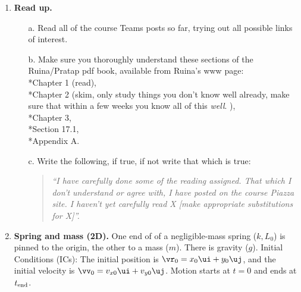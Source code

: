 \documentclass[11pt]{article}
\begin{document}
\begin{enumerate}
\[
\va\times\vb =   (a_2b_3-a_3b_2)\uei +  (a_3b_1-a_1b_3)\ueii  + (a_1b_2-a_2b_1)\ueiii.
\]

Note that, this distributive law implies that, for given $va$, $\va\times$ is a linear operator. That
is $va\times\vv$ is a linear function fo $\vv$.  Later in the course we will use this to replace the cross product with a tensor product. 

\textbf{Hint:} You can read about this in, say, the Ruina/Pratap book (box 1.7). 







\item{\bf Read up.}  

\begin{itemize}
\item[a.] Read all of the course Teams posts so far, trying out all possible links of interest.
\item[b.] Make sure you thoroughly understand these sections of the Ruina/Pratap pdf book, available from Ruina's www page:  \\
*Chapter 1 (read), \\
*Chapter 2 (skim, only study things you don't know well already, make sure that within a few weeks you know all of this \textit{well}. ), \\
*Chapter 3, \\
*Section 17.1, \\
*Appendix A.

\item[c.] Write the following, if true, if not write that which is true: 

\begin{quotation}\noindent \it ``I have carefully done some of the reading assigned.  That which I don't understand or agree with, I have posted on the course Piazza site.  I haven't yet carefully read  X  {\rm [make appropriate substitutions for X]}''.
\end{quotation}

\end{itemize}



\item\textbf{Spring and mass (2D).} One end of of a negligible-mass spring ($k, L_0$) is pinned to the origin, the other to a mass ($m$). There is gravity ($g$).  Initial Conditions (ICs):  The initial position is $\vr_0 = x_0\ui + y_0\uj$, and the initial velocity is $\vv_0= v_{x0}\ui + v_{y0}\uj$. Motion starts at $t=0$ and ends at $t_{\rm end}$.


\end{enumerate}
\end{document}
